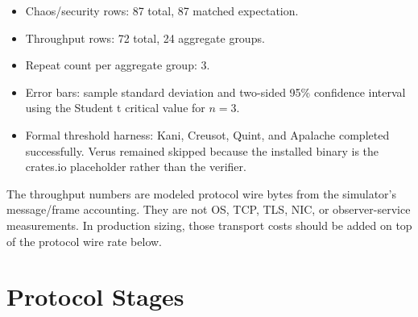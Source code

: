 \documentclass[11pt]{article}
\begin{document}
\begin{itemize}
  \item Chaos/security rows: 87 total, 87 matched expectation.
  \item Throughput rows: 72 total, 24 aggregate groups.
  \item Repeat count per aggregate group: 3.
  \item Error bars: sample standard deviation and two-sided 95\% confidence
  interval using the Student t critical value for \(n=3\).
  \item Formal threshold harness: Kani, Creusot, Quint, and Apalache completed
  successfully. Verus remained skipped because the installed binary is the
  crates.io placeholder rather than the verifier.
\end{itemize}

The throughput numbers are modeled protocol wire bytes from the simulator's
message/frame accounting. They are not OS, TCP, TLS, NIC, or observer-service
measurements. In production sizing, those transport costs should be added on
top of the protocol wire rate below.

\section{Protocol Stages}
\end{document}
